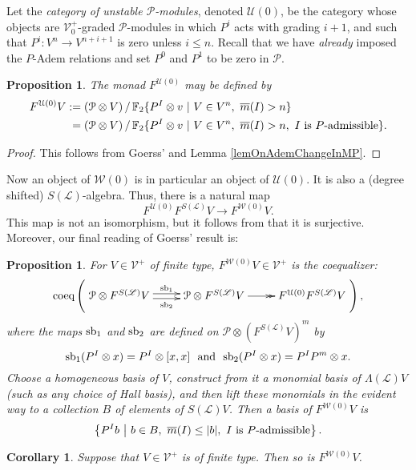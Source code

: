 \documentclass[11pt]{amsart} \renewcommand{\baselinestretch}{1.2}
\theoremstyle{plain}
\newtheorem{prop}[thm]{Proposition}
\newtheorem{cor}[thm]{Corollary}
\numberwithin{equation}{section} %
\theoremstyle{plain}
\newtheorem{prop}[thm]{Proposition}
\newtheorem{cor}[thm]{Corollary}
\numberwithin{equation}{chapter} %
\renewcommand{\to}{\longrightarrow}
\newcommand{\scrL}{\mathscr{L}}
\newcommand{\calU}{\mathcal{U}}
\newcommand{\calP}{\mathcal{P}}
\newcommand{\calV}{\mathcal{V}}
\newcommand{\calw}{\mathcal{W}}
\newcommand{\calu}{\mathcal{U}}
\newcommand{\Palg}{{\calP}}
\newcommand{\LieOperad}{{\scrL}}
\newcommand{\vect}[2]{\calV^{#1}_{#2}}
\newcommand{\minDimP}{\overline{m}}
\newcommand{\F}{\mathbb{F}}
\newcommand{\Ftwo}{\F_2}
\begin{document}
\begin{Constructing cohomology operations}
Let the \emph{category of unstable $\Palg$-modules}, denoted $\calU(0)$, be the category whose objects are $\vect{+}{0}$-graded $\Palg$-modules in which $P^i$ acts with grading $i+1$, and such that $P^i:V^n\to V^{n+i+1}$ is zero unless $i\leq n$. Recall that  we have \emph{already} imposed the $P$-Adem relations and set $P^0$ and $P^1$ to be zero in $\Palg$. 
\begin{prop}
The monad $F^{\calU(0)}$ may be defined by
\begin{alignat*}{2}
F^{\calU(0)}V
:={}&
(\Palg\otimes V)\,/\,\Ftwo \{P^I\otimes v\ |\ V\in V^n,\ \minDimP(I)>n \}%
\\
={}&
(\Palg\otimes V)\,/\,\Ftwo \{P^I\otimes v\ |\ V\in V^n,\ \minDimP(I)>n ,\ I\textup{ is $P$-admissible}\}.%
\end{alignat*}
\end{prop}
\begin{proof}
This follows from Goerss' \cite[Theorem I]{MR1089001} and Lemma \ref{lemOnAdemChangeInMP}.
\end{proof}
Now an object of $\calw(0)$ is in particular an object of $\calU(0)$. It is also a (degree shifted) $S(\LieOperad)$-algebra. Thus, there  is a natural map 
\[F^{\calU(0)}F^{S(\LieOperad)}V\to F^{\calw(0)}V.\]
This map is not an isomorphism, but it follows from \cite[Theorem I]{MR1089001} that it is surjective. Moreover, our final reading of Goerss' result is:
\begin{prop}
\label{partialgoerss}
For $V\in\vect{+}{}$ of finite type,  $F^{\calw(0)}V\in \vect{+}{}$ is the coequalizer:
\[\textup{coeq}\left(\xymatrix@R=4mm{
\Palg\otimes F^{S(\LieOperad)}V
\ar@<+.5ex>[r]^-{\smash{\textup{sb}_1}}
\ar@<-.5ex>[r]_-{\textup{sb}_2}
&%
\Palg\otimes F^{S(\LieOperad)}V
\ar@{->>}[r]
&
F^{\calu(0)}F^{S(\LieOperad)}V%
}\right),\]
where the maps $\textup{sb}_1$ and $\textup{sb}_2$ are defined on  $\Palg\otimes(F^{S(\LieOperad)}V)^{m}$ by
\[\textup{sb}_1(P^I\otimes x)=P^I\otimes [x,x]\textup{ \ and \ }\textup{sb}_2(P^I\otimes x)=P^IP^m\otimes x.\]
Choose a homogeneous basis of $V$, construct from it a monomial  basis of $\Lambda(\LieOperad)V$ (such as any choice of Hall basis), and then lift these monomials in the evident way to a collection $B$ of elements of $S(\LieOperad)V$. Then a basis of $F^{\calw(0)}V$ is 
\[\left\{P^Ib\ \middle|\ b\in B,\ \minDimP(I)\leq|b|,\ \textup{$I$ is $P$-admissible}\right\}.\]
\end{prop}
\begin{cor}
\label{finite type pres by FW0}
Suppose that $V\in\vect{+}{}$ is of finite type. Then so is $F^{\calw(0)}V$.
\end{cor}


\end{Constructing cohomology operations}
\end{document}
